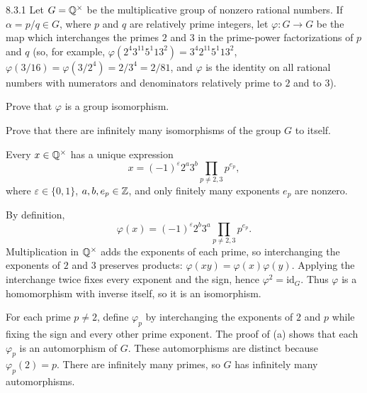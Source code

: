 \documentclass[11pt,oneside]{article}
\begin{document}
\begin{exercise}{8.3.1}
Let $G=\mathbb{Q}^\times$ be the multiplicative group of nonzero rational numbers. If $\alpha=p/q\in G$, where $p$ and $q$ are relatively prime integers, let $\varphi\colon G\to G$ be the map which interchanges the primes $2$ and $3$ in the prime-power factorizations of $p$ and $q$ (so, for example,
$\varphi(2^4 3^{11}5^{1}13^2)=3^4 2^{11}5^{1}13^2$,
$\varphi(3/16)=\varphi(3/2^4)=2/3^4=2/81$, and $\varphi$ is the identity on all rational numbers with numerators and denominators relatively prime to $2$ and to $3$).
\begin{exercisesubparts}
\item Prove that $\varphi$ is a group isomorphism.
\item Prove that there are infinitely many isomorphisms of the group $G$ to itself.
\end{exercisesubparts}
\end{exercise}
\begin{solution}
Every $x\in\mathbb{Q}^\times$ has a unique expression
\[
x=(-1)^\varepsilon 2^a3^b\prod_{p\neq2,3}p^{e_p},
\]
where $\varepsilon\in\{0,1\}$, $a,b,e_p\in\mathbb{Z}$, and only finitely many exponents $e_p$ are nonzero.
\begin{exercisesubparts}
\item By definition,
\[
\varphi(x)=(-1)^\varepsilon 2^b3^a\prod_{p\neq2,3}p^{e_p}.
\]
Multiplication in $\mathbb{Q}^\times$ adds the exponents of each prime, so interchanging the exponents of $2$ and $3$ preserves products: $\varphi(xy)=\varphi(x)\varphi(y)$. Applying the interchange twice fixes every exponent and the sign, hence $\varphi^2=\mathrm{id}_G$. Thus $\varphi$ is a homomorphism with inverse itself, so it is an isomorphism.
\item For each prime $p\neq2$, define $\varphi_p$ by interchanging the exponents of $2$ and $p$ while fixing the sign and every other prime exponent. The proof of (a) shows that each $\varphi_p$ is an automorphism of $G$. These automorphisms are distinct because $\varphi_p(2)=p$. There are infinitely many primes, so $G$ has infinitely many automorphisms.
\end{exercisesubparts}
\end{solution}
\end{document}

